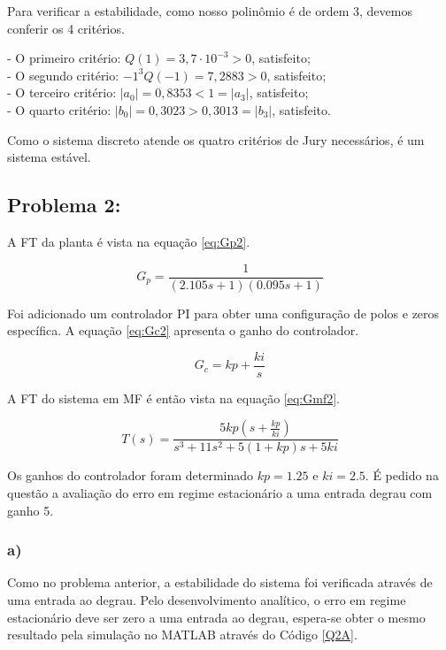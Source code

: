 Para verificar a estabilidade, como nosso polinômio é de ordem 3, devemos conferir os 4 critérios.

- O primeiro critério: $Q(1)= 3,7 \cdot 10^{-3} > 0$, satisfeito; \\
- O segundo critério: $-1^3 Q(-1) = 7,2883 > 0$, satisfeito;\\
- O terceiro critério: $|a_0| = 0,8353 < 1 = |a_3|$, satisfeito; \\
- O quarto critério: $|b_0| = 0,3023 > 0,3013 = |b_3| $, satisfeito. 

Como o sistema discreto atende os quatro critérios de Jury necessários, é um sistema estável.

\subsection*{Problema 2:}

    A FT da planta é vista na equação \ref{eq:Gp2}. 

    \begin{equation}
        G_p = \frac{1}{(2.105s+1)(0.095s+1)}
        \label{eq:Gp2}
    \end{equation}

    Foi adicionado um controlador PI para obter uma configuração de polos e zeros específica. A equação \ref{eq:Gc2} apresenta
    o ganho do controlador. 

    \begin{equation}
        G_c = kp + \frac{ki}{s}
        \label{eq:Gc2}
    \end{equation}

    A FT do sistema em MF é então vista na equação \ref{eq:Gmf2}.

    \begin{equation}
        T(s) = \frac{5kp(s+\frac{kp}{ki})}{s^3+11s^2+5(1+kp)s+5ki}
        \label{eq:Gmf2}
    \end{equation}

    Os ganhos do controlador foram determinado $kp=1.25$ e $ki = 2.5$. É pedido na questão a avaliação do erro em regime
    estacionário a uma entrada degrau com ganho 5. 

    \subsubsection*{a)}
        Como no problema anterior, a estabilidade do sistema foi verificada através de uma entrada ao degrau. 
        Pelo desenvolvimento analítico, o erro em regime estacionário deve ser zero a uma entrada ao degrau, 
        espera-se obter o mesmo resultado pela simulação no MATLAB através do Código \ref{Q2A}.

